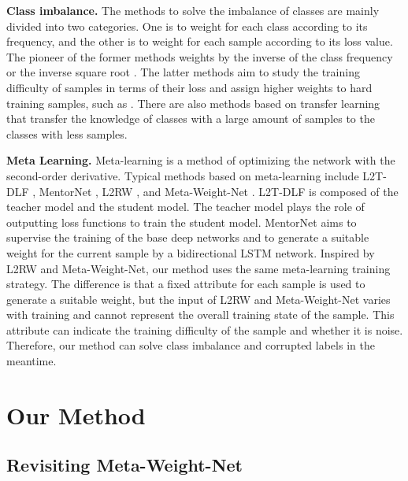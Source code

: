 \documentclass[letterpaper]{article} %
\newcommand{\bd}[1]{\textbf{#1}}
\begin{document}
\noindent\bd{Class imbalance.}
The methods to solve the imbalance of classes are mainly divided into two categories.
One is to weight for each class according to its frequency, and the other is to weight for each sample according to its loss value.
The pioneer of the former methods weights by the inverse of the class frequency \cite{huang2016learning,wang2017learning} or the inverse square root \cite{mahajan2018exploring,mikolov2013distributed}.
The latter methods aim to study the training difficulty of  samples in terms of their loss and assign higher weights to hard training samples, such as \cite{freund1997decision,lin2017focal,malisiewicz2011ensemble,dong2017class}.
There are also methods based on transfer learning \cite{wang2017learning,cui2018large} that transfer the knowledge of classes with a large amount of samples to the classes with less samples.

\noindent\bd{Meta Learning.}
Meta-learning \cite{finn2017model,antoniou2018train,li2017meta,shu2018small,ravi2016optimization} is a method of optimizing the network with the second-order derivative.
Typical methods based on meta-learning include L2T-DLF \cite{wu2018learning}, MentorNet \cite{jiang2018mentornet}, L2RW \cite{ren2018learning}, and Meta-Weight-Net \cite{shu2019meta}.
L2T-DLF is composed of the teacher model and the student model.
The teacher model plays the role of outputting loss functions to train the student model.
MentorNet aims to supervise the training of the base deep networks and to generate a suitable weight for the current sample by a bidirectional LSTM network.
Inspired by L2RW and Meta-Weight-Net, our method uses the same meta-learning training strategy.
The difference is that a fixed attribute for each sample is used to generate a suitable weight, but the input of L2RW and Meta-Weight-Net varies with training and cannot represent the overall training state of the sample.
This attribute can indicate the training difficulty of the sample and whether it is noise.
Therefore, our method can solve class imbalance and corrupted labels in the meantime.



\section{Our Method}
\subsection{Revisiting Meta-Weight-Net}
\label{sec:revisit}
\end{document}
